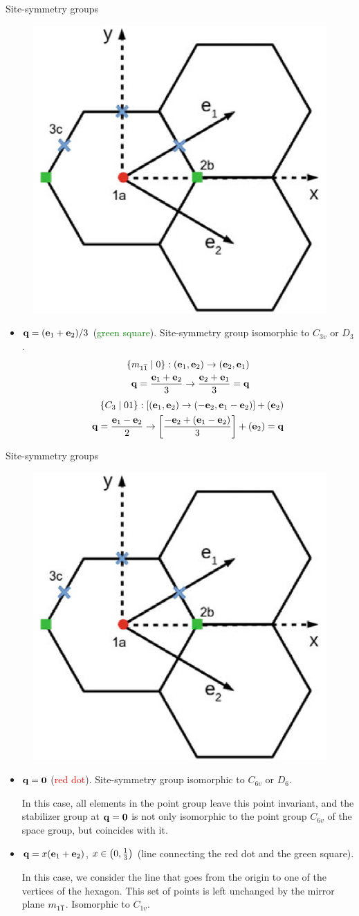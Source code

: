 \documentclass[10pt,aspectratio=169,xcolor={table,dvipsnames}]{beamer}
\begin{document}
\begin{frame}{Site-symmetry groups}
\begin{figure}[H]
\centering
\includegraphics[width=0.22\linewidth]{fig/wyckoff_pos.png}
\end{figure}
\begin{itemize}
\item ${\vb{q}} = ({\vb{e}}_1 + {\vb{e}}_2) / 3$ (\textcolor{green}{green square}). Site-symmetry group isomorphic to $C_{3v}$ or $D_3$.
\begin{align*}
\{m_{1\overline{1}} \mid 0\}: ({\vb{e}}_1, {\vb{e}}_2) \to ({\vb{e}}_2, {\vb{e}}_1)
\\
{\vb{q}} = \frac{{\vb{e}}_1+{\vb{e}}_2}{3} \to \frac{{\vb{e}}_2+{\vb{e}}_1}{3} = {\vb{q}}
\end{align*}
\begin{align*}
\{C_3 \mid 01\}: [({\vb{e}}_1, {\vb{e}}_2) \to (-{\vb{e}}_2, {\vb{e}}_1-{\vb{e}}_2)] + ({\vb{e}}_2)
\\
{\vb{q}} = \frac{{\vb{e}}_1-{\vb{e}}_2}{2} \to \qty[\frac{-{\vb{e}}_2+({\vb{e}}_1-{\vb{e}}_2)}{3}] + ({\vb{e}}_2) = {\vb{q}}
\end{align*}
\end{itemize}
\end{frame}

\begin{frame}{Site-symmetry groups}
\begin{figure}[H]
\centering
\includegraphics[width=0.22\linewidth]{fig/wyckoff_pos.png}
\end{figure}
\begin{itemize}
\item ${\vb{q}} = {\vb{0}}$ (\textcolor{red}{red dot}). Site-symmetry group isomorphic to $C_{6v}$ or $D_6$.

In this case, all elements in the point group leave this point invariant, and the stabilizer group at ${\vb{q}}={\vb{0}}$ is not only isomorphic to the point group $C_{6v}$ of the space group, but coincides with it.

\n

\item ${\vb{q}} = x({\vb{e}}_1+{\vb{e}}_2)$, $x \in \qty(0, \frac{1}{3})$ (line connecting the red dot and the green square).

In this case, we consider the line that goes from the origin to one of the vertices of the hexagon. This set of points is left unchanged by the mirror plane $m_{1\overline{1}}$. Isomorphic to $C_{1v}$.
\end{itemize}
\end{frame}
\end{document}
